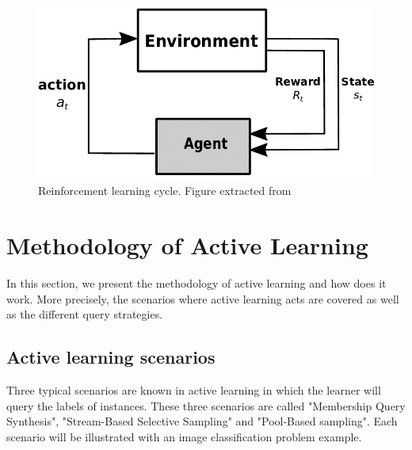 \documentclass[11pt, openany]{report}
\theoremstyle{plain}
\theoremstyle{definition}
\theoremstyle{remark}
\begin{document}
\begin{figure}[H]
  \centering
  \includegraphics[scale=0.45]{figures/reinf-process.png}
  \caption{Reinforcement learning cycle. Figure extracted from \cite{reinf-process-fig}}
  \label{fig:reinf-process}
\end{figure} 

 

\section{Methodology of Active Learning}
In this section, we present the methodology of active learning and how does it work. More precisely, the scenarios where active learning acts are covered as well as the different query strategies.  

\subsection{Active learning scenarios}

Three typical scenarios are known in active learning in which the learner will query the labels of instances. These three scenarios are called "Membership Query Synthesis", "Stream-Based Selective Sampling" and "Pool-Based sampling". Each scenario will be illustrated with an image classification problem example. 
\end{document}
